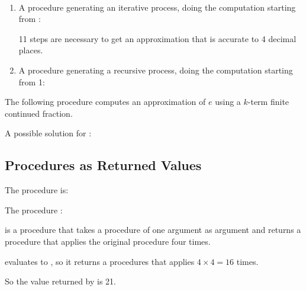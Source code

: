 \begin{exe}[1.37]
    \ \vspace{-20pt}
    \begin{enumerate}
        \item A procedure  generating an iterative process, 
            doing the computation starting from :

            11 steps are necessary to get an approximation that is accurate to 
            4 decimal places.

        \item A procedure  generating a recursive process, doing 
            the computation starting from 1:
    \end{enumerate}
\end{exe}

\begin{exe}[1.38]
    The following procedure computes an approximation of $e$ using a $k$-term 
    finite continued fraction.
\end{exe}

\begin{exe}[1.39]
    A possible solution for :
\end{exe}

\subsection{Procedures as Returned Values}

\begin{exe}[1.40]
    The procedure  is:
\end{exe}

\begin{exe}[1.41]
    The procedure :

     is a procedure that takes a procedure of one argument 
    as argument and returns a procedure that applies the original procedure four 
    times.

     evaluates to
    , so it returns a procedures 
    that applies  $4 \times 4 = 16$ times.

    So the value returned by  is 21.
\end{exe}


